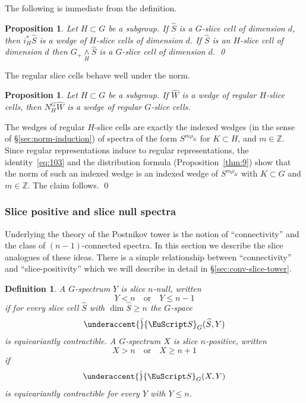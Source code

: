\documentclass{amsart}
\newtheorem{prop}[equation]{Proposition}
\newtheorem{definition}[equation]{Definition}
\newenvironment{defin}{\begin{definition}\rm}{\end{definition}}
\theoremstyle{definition}
\newtheorem{defin}[equation]{Definition}
\theoremstyle{remark}
\newenvironment{pf}{\bigskip{\em Proof:\/}}{\qed\medskip}
\newcommand{\Z}{{\mathbb Z}}
\newcommand{\spectra}{\EuScript S}
\newcommand{\smashove}[1]{\underset{#1}{\wedge}}
\newcommand{\norm}{N}
\newcommand{\gspectra}[1]{\underaccent{\bar}{\spectra}_{#1}}
\newcommand{\slicecell}{\widehat{S}}
\newcommand{\refine}{\widehat{W}}
\begin{document}
The following is immediate from the definition.

\begin{prop}\label{thm:32}
Let $H\subset G$ be a subgroup.  If $\slicecell$ is a $G$-slice cell of
dimension $d$, then $i_{H}^{\ast}\slicecell$ is a wedge of $H$-slice cells of
dimension $d$.  If $\slicecell$ is an $H$-slice cell of dimension $d$ then
$G_{+}\smashove{H}\slicecell$ is a $G$-slice cell of dimension $d$.  \qed
\end{prop}

The regular slice cells behave well under the norm.

\begin{prop}
\label{thm:77}
Let $H\subset G$ be a subgroup.  If $\refine$ is a wedge of regular
$H$-slice cells, then $\norm_{H}^{G}\refine$ is a wedge of regular
$G$-slice cells.
\end{prop}

\begin{pf}
The wedges of regular $H$-slice cells are exactly the indexed wedges
(in the sense of \S\ref{sec:norm-induction}) of spectra of the form
$S^{m\rho_{K}}$ for $K\subset H$, and $m\in\Z$.  Since regular
representations induce to regular representations, the
identity~\eqref{eq:103} and the distribution formula
(Proposition~\ref{thm:9}) show that the norm of such an indexed wedge
is an indexed wedge of $S^{m\rho_{K}}$ with $K\subset G$ and
$m\in\Z$.  The claim follows.
\end{pf}



\subsubsection{Slice positive and slice null spectra}
\label{sec:slice-positive-slice}

Underlying the theory of the Postnikov tower is the notion of
``connectivity'' and the class of $(n-1)$-connected spectra.  In this
section we describe the slice analogues of these ideas.  There is a
simple relationship between ``connectivity'' and
``slice-positivity'' which we will describe in detail in
\S\ref{sec:conv-slice-tower}.

\begin{defin}
\label{def:41} A $G$-spectrum $Y$ is {\em slice $n$-null}, written
\[
Y < n\quad\text{or}\quad Y \le n-1
\]
if for every slice cell $\slicecell$ with $\dim \slicecell\ge n$ the
$G$-space
\[
\gspectra{G}(\slicecell,Y)
\]
is equivariantly contractible.  A $G$-spectrum $X$ is {\em slice $n$-positive}, written
\[
X> n\quad\text{or}\quad X \ge n+1
\]
if 
\[
\gspectra{G}(X,Y)
\]
is equivariantly contractible for every $Y$ with $Y\le n$.
\end{defin}
\end{document}
